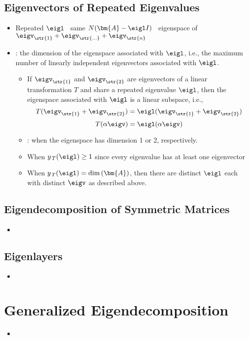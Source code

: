 \begin{itemize}
  \subsection{Eigenvectors of Repeated Eigenvalues}\label{Eigenvectors of Repeated Eigenvalues}
  \begin{itemize}
    \item Repeated \(\eigl\) \to~same \(N(\bm{A}-\eigl I)\) \to~eigenspace of \(\eigv_\str{1} + \eigv_\str{\ldots} + \eigv_\str{n} \)
    \item {}: the dimension of the eigenspace associated with \(\eigl\), i.e., the maximum number of linearly independent eigenvectors associated with \(\eigl\).
    \begin{itemize}
      \item If \(\eigv_\str{1}\) and \(\eigv_\str{2}\) are eigenvectors of a linear transformation \(T\) and share a repeated eigenvalue \(\eigl\), then the eigenspace associated with \(\eigl\) is a linear subspace, i.e.,
      \[%
      T(\eigv_\str{1} + \eigv_\str{2}) = \eigl(\eigv_\str{1} + \eigv_\str{2})
      \]%
      \[%
      T(\alpha \eigv) = \eigl(\alpha \eigv)
      \]%
      \item {}: when the eigenspace has dimension 1 or 2, respectively.
      \item When \(y_{\, T}(\eigl) \geq 1 \) since every eigenvalue has at least one eigenvector
      \item When \(y_{\, T}(\eigl)= \dim{(\bm{A})}\), then there are distinct \(\eigl\) each with distinct \(\eigv\) as described above.
    \end{itemize}
  \end{itemize}

  \subsection{Eigendecomposition of Symmetric Matrices}\label{Eigendecomposition of Symmetric Matrices}
  \begin{itemize}
    \item 
  \end{itemize}
  
  \subsection{Eigenlayers}\label{Eigenlayers}
  \begin{itemize}
    \item 
  \end{itemize}
  
\end{itemize}

\section{Generalized Eigendecomposition}\label{Generalized Eigendecomposition}
\begin{itemize}
  \item 
\end{itemize}


